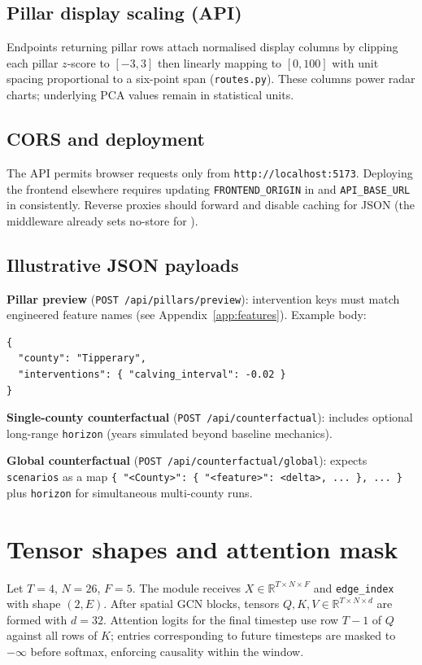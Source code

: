 \documentclass[11pt,a4paper]{article}
\begin{document}
\subsection{Pillar display scaling (API)}
Endpoints returning pillar rows attach normalised display columns by clipping each pillar $z$-score to $[-3,3]$ then linearly mapping to $[0,100]$ with unit spacing proportional to a six-point span (\texttt{routes.py}). These columns power radar charts; underlying PCA values remain in statistical units.

\subsection{CORS and deployment}
The API permits browser requests only from \texttt{http://localhost:5173}. Deploying the frontend elsewhere requires updating \texttt{FRONTEND\_ORIGIN} in  and \texttt{API\_BASE\_URL} in  consistently. Reverse proxies should forward  and disable caching for JSON (the middleware already sets no-store for ).

\subsection{Illustrative JSON payloads}
\noindent\textbf{Pillar preview} (\texttt{POST /api/pillars/preview}): intervention keys must match engineered feature names (see Appendix~\ref{app:features}). Example body:
\begin{verbatim}
{
  "county": "Tipperary",
  "interventions": { "calving_interval": -0.02 }
}
\end{verbatim}
\noindent\textbf{Single-county counterfactual} (\texttt{POST /api/counterfactual}): includes optional long-range \texttt{horizon} (years simulated beyond baseline mechanics).

\noindent\textbf{Global counterfactual} (\texttt{POST /api/counterfactual/global}): expects \texttt{scenarios} as a map \texttt{\{ "<County>": \{ "<feature>": <delta>, ... \}, ... \}} plus \texttt{horizon} for simultaneous multi-county runs.

\appendix
\section{Tensor shapes and attention mask}
Let $T{=}4$, $N{=}26$, $F{=}5$. The module receives $X\in\mathbb{R}^{T\times N\times F}$ and \texttt{edge\_index} with shape $(2,E)$. After spatial GCN blocks, tensors $Q,K,V\in\mathbb{R}^{T\times N\times d}$ are formed with $d{=}32$. Attention logits for the final timestep use row $T{-}1$ of $Q$ against all rows of $K$; entries corresponding to future timesteps are masked to $-\infty$ before softmax, enforcing causality within the window.
\end{document}
